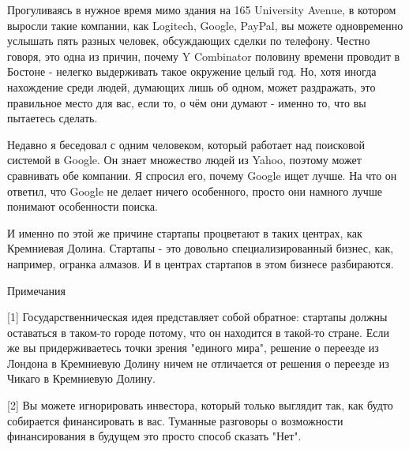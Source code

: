 \documentclass[ebook,12pt,oneside,openany]{memoir}
\begin{document}
Прогуливаясь в нужное время мимо здания на 165 University Avenue, в
котором выросли такие компании, как Logitech, Google, PayPal, вы
можете одновременно услышать пять разных человек, обсуждающих сделки
по телефону. Честно говоря, это одна из причин, почему Y Combinator
половину времени проводит в Бостоне - нелегко выдерживать такое
окружение целый год. Но, хотя иногда нахождение среди людей, думающих
лишь об одном, может раздражать, это правильное место для вас, если
то, о чём они думают - именно то, что вы пытаетесь сделать.

Недавно я беседовал с одним человеком, который работает над поисковой
системой в Google. Он знает множество людей из Yahoo, поэтому может
сравнивать обе компании. Я спросил его, почему Google ищет лучше. На
что он ответил, что Google не делает ничего особенного, просто они
намного лучше понимают особенности поиска.

И именно по этой же причине стартапы процветают в таких центрах, как
Кремниевая Долина. Стартапы - это довольно специализированный бизнес,
как, например, огранка алмазов. И в центрах стартапов в этом бизнесе
разбираются.

Примечания

[1] Государственническая идея представляет собой обратное: стартапы
должны оставаться в таком-то городе потому, что он находится в
такой-то стране. Если же вы придерживаетесь точки зрения "единого
мира", решение о переезде из Лондона в Кремниевую Долину ничем не
отличается от решения о переезде из Чикаго в Кремниевую Долину.

[2] Вы можете игнорировать инвестора, который только выглядит так, как
будто собирается финансировать в вас. Туманные разговоры о возможности
финансирования в будущем это просто способ сказать "Нет".
\end{document}
